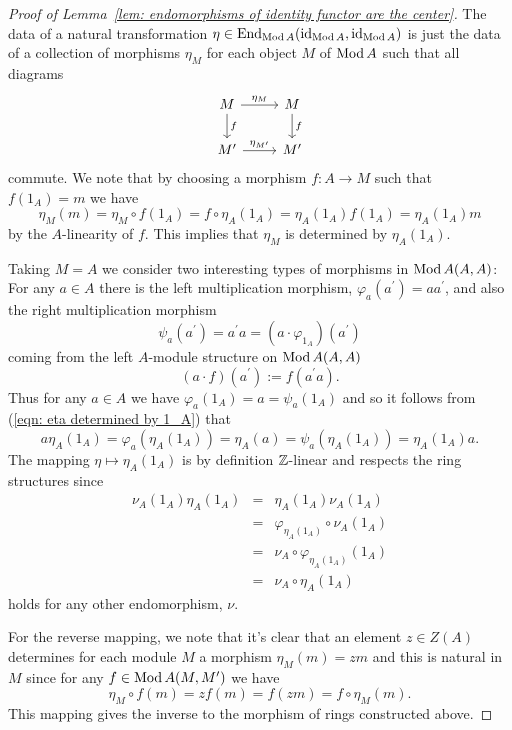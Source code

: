 \documentclass[reqno, 12pt]{amsart}
\begin{document}
\begin{proof}[Proof of Lemma~\ref{lem: endomorphisms of identity functor are the center}]
  The data of a natural transformation $\eta \in \operatorname{End}_{\operatorname{Mod}A}(\operatorname{id}_{\operatorname{Mod}A},\operatorname{id}_{\operatorname{Mod}A})$ is just the data of a collection of morphisms $\eta_M$ for each object $M$ of $\operatorname{Mod}A$ such that all diagrams
$$\begin{tikzcd}
  M \arrow{r}{\eta_M}\arrow{d}{f} & M\arrow{d}{f}\\
  M^\prime \arrow{r}{\eta_{M^\prime}} & M^\prime
\end{tikzcd}$$
commute.
We note that by choosing a morphism $f \colon A \to M$ such that $f(1_A) = m$ we have
\begin{equation}\label{eqn: eta determined by 1_A}
  \eta_M(m) = \eta_M \circ f(1_A) = f \circ \eta_A(1_A) = \eta_A(1_A) f(1_A) = \eta_A(1_A) m
\end{equation}
by the $A$-linearity of $f$.
This implies that $\eta_M$ is determined by $\eta_A(1_A)$.

Taking $M = A$ we consider two interesting types of morphisms in $\operatorname{Mod}A(A,A)$:
For any $a \in A$ there is the left multiplication morphism, $\varphi_a(a^\prime) = aa^\prime$, and also the right multiplication morphism
$$\psi_a(a^\prime) = a^\prime a = (a \cdot \varphi_{1_A})(a^\prime)$$
coming from the left $A$-module structure on $\operatorname{Mod}A(A,A)$
$$(a \cdot f)(a^\prime) := f(a^\prime a).$$
Thus for any $a \in A$ we have $\varphi_a(1_A) = a = \psi_a(1_A)$
and so it follows from (\ref{eqn: eta determined by 1_A}) that
$$a \eta_A(1_A) = \varphi_a(\eta_A(1_A)) = \eta_A(a) = \psi_a(\eta_A(1_A))= \eta_A(1_A)a.$$
The mapping $\eta \mapsto \eta_A(1_A)$ is by definition $\mathbb{Z}$-linear and respects the ring structures since
\begin{eqnarray*}
  \nu_A(1_A) \eta_A(1_A) &=& \eta_A(1_A) \nu_A(1_A)\\
  &=& \varphi_{\eta_A(1_A)} \circ \nu_A(1_A)\\
  &=& \nu_A \circ \varphi_{\eta_A(1_A)}(1_A)\\
  &=& \nu_A \circ \eta_A(1_A)
\end{eqnarray*}
holds for any other endomorphism, $\nu$.

For the reverse mapping, we note that it's clear that an element $z \in Z(A)$ determines for each module $M$ a morphism $\eta_M(m) = zm$ and this is natural in $M$ since for any $f \in \operatorname{Mod}A(M,M^\prime)$ we have
$$\eta_M \circ f(m) = zf(m) = f(zm) = f \circ \eta_M(m).$$
This mapping gives the inverse to the morphism of rings constructed above.
\end{proof}
\end{document}

